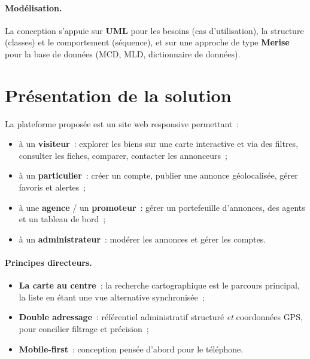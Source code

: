 \paragraph{Modélisation.}
La conception s'appuie sur \textbf{UML} pour les besoins (cas d'utilisation), la
structure (classes) et le comportement (séquence), et sur une approche de type
\textbf{Merise} pour la base de données (MCD, MLD, dictionnaire de données).

\section{Présentation de la solution}
\label{sec:solution}

La plateforme proposée est un site web responsive permettant~:
\begin{itemize}[label=\textbullet,itemsep=1pt]
  \item à un \textbf{visiteur}~: explorer les biens sur une carte interactive et
        via des filtres, consulter les fiches, comparer, contacter les
        annonceurs~;
  \item à un \textbf{particulier}~: créer un compte, publier une annonce
        géolocalisée, gérer favoris et alertes~;
  \item à une \textbf{agence} / un \textbf{promoteur}~: gérer un portefeuille
        d'annonces, des agents et un tableau de bord~;
  \item à un \textbf{administrateur}~: modérer les annonces et gérer les comptes.
\end{itemize}

\paragraph{Principes directeurs.}
\begin{itemize}[label=\textbullet,itemsep=1pt]
  \item \textbf{La carte au centre}~: la recherche cartographique est le
        parcours principal, la liste en étant une vue alternative synchronisée~;
  \item \textbf{Double adressage}~: référentiel administratif structuré
        \emph{et} coordonnées GPS, pour concilier filtrage et précision~;
  \item \textbf{Mobile-first}~: conception pensée d'abord pour le téléphone.
\end{itemize}

